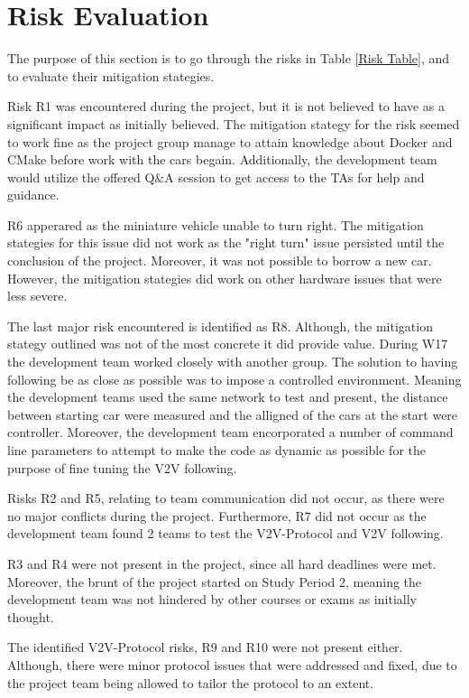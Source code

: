 \documentclass[12pt]{article}
\begin{document}
\section{Risk Evaluation}
The purpose of this section is to go through the risks in Table \ref{Risk Table}, and to evaluate their mitigation stategies. \par 
Risk R1 was encountered during the project, but it is not believed to have as a significant impact as initially believed. The mitigation stategy for the risk seemed to work fine as the project group manage to attain knowledge about Docker and CMake before work with the cars begain. Additionally, the development team would utilize the offered Q\&A session to get access to the TAs for help and guidance. \par
R6 apperared as the miniature vehicle unable to turn right. The mitigation stategies for this issue did not work as the "right turn" issue persisted until the conclusion of the project. Moreover, it was not possible to borrow a new car. However, the mitigation stategies did work on other hardware issues that were less severe.  \par
The last major risk encountered is identified as R8. Although, the mitigation stategy outlined was not of the most concrete it did provide value. During W17 the development team worked closely with another group. The solution to having following be as close as possible was to impose a controlled environment. Meaning the development teams used the same network to test and present, the distance between starting car were measured and the alligned of the cars at the start were controller. Moreover, the development team encorporated a number of command line parameters to attempt to make the code as dynamic as possible for the purpose of fine tuning the V2V following. \par
Risks R2 and R5, relating to team communication did not occur, as there were no major conflicts during the project. Furthermore, R7 did not occur as the development team found 2 teams to test the V2V-Protocol and V2V following.  \par
R3 and R4 were not present in the project, since all hard deadlines were met. Moreover, the brunt of the project started on Study Period 2, meaning the development team was not hindered by other courses or exams as initially thought. \par
The identified V2V-Protocol risks, R9 and R10 were not present either. Although, there were minor protocol issues that were addressed and fixed, due to the project team being allowed to tailor the protocol to an extent.
\end{document}
